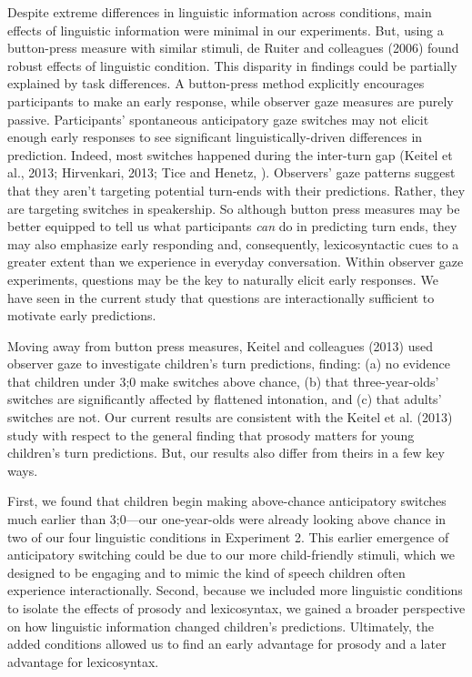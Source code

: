 \documentclass[authoryear, 12pt]{elsarticle}
\begin{document}
Despite extreme differences in linguistic information across conditions, main effects of linguistic information were minimal in our experiments. But, using a button-press measure with similar stimuli, de Ruiter and colleagues (2006) found robust effects of linguistic condition. This disparity in findings could be partially explained by task differences. A button-press method explicitly encourages participants to make an early response, while observer gaze measures are purely passive. Participants' spontaneous anticipatory gaze switches may not elicit enough early responses to see significant linguistically-driven differences in prediction. Indeed, most switches happened during the inter-turn gap (Keitel et al., 2013; Hirvenkari, 2013; Tice and Henetz, \citeyear{TiceHenetz11}). Observers' gaze patterns suggest that they aren't targeting potential turn-ends with their predictions. Rather, they are targeting switches in speakership. So although button press measures may be better equipped to tell us what participants \textit{can} do in predicting turn ends, they may also emphasize early responding and, consequently, lexicosyntactic cues to a greater extent than we experience in everyday conversation. Within observer gaze experiments, questions may be the key to naturally elicit early responses. We have seen in the current study that questions are interactionally sufficient to motivate early predictions.

Moving away from button press measures, Keitel and colleagues (2013) used observer gaze to investigate children's turn predictions, finding: (a) no evidence that children under 3;0 make switches above chance, (b) that three-year-olds' switches are significantly affected by flattened intonation, and (c) that adults' switches are not. Our current results are consistent with the Keitel et al. (2013) study with respect to the general finding that prosody matters for young children's turn predictions. But, our results also differ from theirs in a few key ways. 

First, we found that children begin making above-chance anticipatory switches much earlier than 3;0---our one-year-olds were already looking above chance in two of our four linguistic conditions in Experiment 2. This earlier emergence of anticipatory switching could be due to our more child-friendly stimuli, which we designed to be engaging and to mimic the kind of speech children often experience interactionally. Second, because we included more linguistic conditions to isolate the effects of prosody and lexicosyntax, we gained a broader perspective on how linguistic information changed children's predictions. Ultimately, the added conditions allowed us to find an early advantage for prosody and a later advantage for lexicosyntax.
\end{document}
